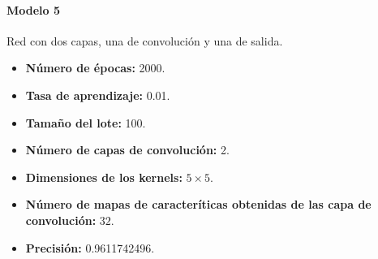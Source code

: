 \paragraph{Modelo 5}

Red con dos capas, una de convolución y una de salida.

\begin{itemize}
\item \textbf{Número de épocas:} 2000.
\item \textbf{Tasa de aprendizaje:} 0.01.
\item \textbf{Tamaño del lote:} 100.
\item \textbf{Número de capas de convolución:} 2.
\item \textbf{Dimensiones de los kernels:} $5 \times 5$.
\item \textbf{Número de mapas de caracteríticas obtenidas de las capa de convolución:} $32$.
\item \textbf{Precisión:} 0.9611742496.
\end{itemize}


